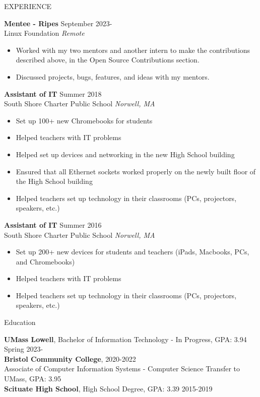 \documentclass{resume} %
\begin{document}
\begin{rSection}{EXPERIENCE}
	
\textbf{Mentee - Ripes} \hfill September 2023- \\
Linux Foundation \hfill \textit{Remote}
\vspace{-.75em}
\begin{itemize}
	\itemsep -8pt{}
	\item Worked with my two mentors and another intern to make the contributions described above, in the Open Source Contributions section.
	\item Discussed projects, bugs, features, and ideas with my mentors.
\end{itemize}

\vspace{-.75em}
\textbf{Assistant of IT} \hfill Summer 2018 \\
South Shore Charter Public School \hfill \textit{Norwell, MA}
\vspace{-.75em}
 \begin{itemize}
 	\itemsep -8pt{}
 	\item Set up 100+ new Chromebooks for students
     \item Helped teachers with IT problems
     \item Helped set up devices and networking in the new High School building
     \item Ensured that all Ethernet sockets worked properly on the newly built floor of the High School building
     \item Helped teachers set up technology in their classrooms (PCs, projectors, speakers, etc.)
 \end{itemize}

\textbf{Assistant of IT} \hfill Summer 2016 \\
South Shore Charter Public School \hfill \textit{Norwell, MA}
 \begin{itemize}
 	\itemsep -8pt{}
 	\item Set up 200+ new devices for students and teachers (iPads, Macbooks, PCs, and Chromebooks)
     \item Helped teachers with IT problems
     \item Helped teachers set up technology in their classrooms (PCs, projectors, speakers, etc.)
 \end{itemize}

\end{rSection}

\begin{rSection}{Education}

{\bf UMass Lowell}, Bachelor of Information Technology - In Progress, GPA: 3.94 \hfill {Spring 2023-} \\
{\bf Bristol Community College},  \hfill {2020-2022} \\
Associate of Computer Information Systems - Computer Science Transfer to UMass, GPA: 3.95 \\
{\bf Scituate High School}, High School Degree, GPA: 3.39 \hfill {2015-2019} \\

\end{rSection}
\end{document}
